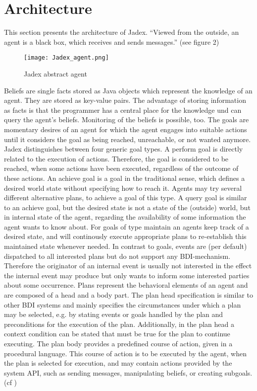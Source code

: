 \documentclass{llncs}
\begin{document}
\section{Architecture}
This section presents the architecture of Jadex. "`Viewed from the outside, an agent is a black box, which receives and sends messages."' \cite{Pokahr} (see figure 2)
\begin{figure}
	\centering
	\texttt{[image: Jadex\_agent.png]}
	\caption{Jadex abstract agent \cite{Pokahr}}
	\label{fig2}
\end{figure}
Beliefs are single facts stored as Java objects which represent the knowledge of an agent. They are stored as key-value pairs. The advantage of storing information as facts is that the programmer has a central place for the knowledge und can query the agent's beliefs. Monitoring of the beliefs is possible, too. 
The goals are momentary desires of an agent for which the agent engages into suitable actions until it considers the goal as being reached, unreachable, or not wanted anymore. Jadex distinguishes between four generic goal types. A perform goal is directly related to the execution of actions. Therefore, the goal is considered to be reached, when some actions have been executed, regardless of the outcome of these actions. An achieve goal is a goal in the traditional sense, which defines a desired world state without specifying how to reach it. Agents may try several different alternative plans, to achieve a goal of this type. A query goal is similar to an achieve goal, but the desired state is not a state of the (outside) world, but in internal state of the agent, regarding the availability of some information the agent wants to know about. For goals of type maintain an agents keep track of a desired state, and will continously execute appropriate plans to re-establish this maintained state whenever needed. In contrast to goals, events are (per default) dispatched to all interested plans but do not support any BDI-mechanism. Therefore the originator of an internal event is usually not interested in the effect the internal event may produce but only wants to inform some interested parties about some occurrence. Plans represent the behavioral elements of an agent and are composed of a head and a body part. The plan head specification is similar to other BDI systems and mainly specifies the circumstances under which a plan may be selected, e.g. by stating events or goals handled by the plan and preconditions for the execution of the plan. Additionally, in the plan head a context condition can be stated that must be true for the plan to continue executing. The plan body provides a predefined course of action, given in a procedural language. This course of action is to be executed by the agent, when the plan is selected for execution, and may contain actions provided by the system API, such as sending messages, manipulating beliefs, or creating subgoals. (cf \cite{Pokahr2})
\end{document}
